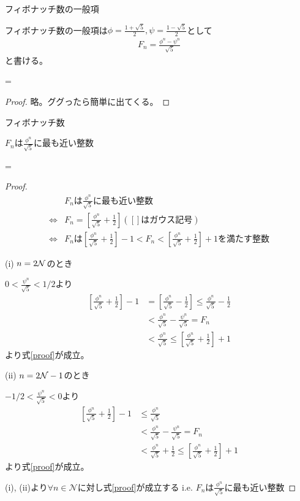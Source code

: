 \documentclass[a4paper,11pt]{jsarticle}
\newcommand{\EndIt}{}
\newenvironment{barred}[2][]{%
  \renewcommand{\EndIt}{\end{#2}}%
  \begin{#2}#1\noindent\newline
  \begin{lrbox}{\probbox}%
  \addtolength{\linewidth}{-12pt}%
  \begin{minipage}[t]{\linewidth}%
  \nointerlineskip
}{%
  \par
  \xdef\ResetDepth{\prevdepth=\the\prevdepth\relax}%
  \unskip\unskip\unpenalty
  \end{minipage}%
  \end{lrbox}%
  \noindent
  \makebox[\columnwidth]{%
    \hfill\vrule\hspace{2pt}\vrule\hfill
    \usebox{\probbox}}%
  \EndIt
  \ResetDepth
}
\begin{document}
\begin{barred}[フィボナッチ数の一般項]{Prop}
フィボナッチ数の一般項は$\phi = \frac{1 + \sqrt{5}}{2}, \psi = \frac{1 - \sqrt{5}}{2}$として
\begin{align}
F_n = \frac{\phi^n - \psi^n}{\sqrt{5}}
\end{align}
と書ける。
\end{barred}
\begin{proof}
略。ググったら簡単に出てくる。
\end{proof}

\begin{barred}[フィボナッチ数]{Prop}
$F_n$は$\frac{\phi^n}{\sqrt{5}}$に最も近い整数
\end{barred}

\begin{proof}
\begin{align}
&F_nは\frac{\phi^n}{\sqrt{5}}に最も近い整数\\
\Leftrightarrow& F_n = \left[ \frac{\phi^n}{\sqrt{5}} + \frac{1}{2} \right] ( [] はガウス記号 ) \\
\Leftrightarrow& F_n は \left[ \frac{\phi^n}{\sqrt{5}} + \frac{1}{2} \right] -1 < F_n < \left[ \frac{\phi^n}{\sqrt{5}} + \frac{1}{2} \right] + 1 を満たす整数
\label{proof}
\end{align}

(i) $n = 2\bold{\mathcal{N}}$のとき

$0<\frac{\psi^n}{\sqrt{5}}<1/2$より
\begin{align}
\left[ \frac{\phi^n}{\sqrt{5}} + \frac{1}{2} \right] -1
 &= \left[ \frac{\phi^n}{\sqrt{5}} - \frac{1}{2} \right]
 \le \frac{\phi^n}{\sqrt{5}} - \frac{1}{2} \\
 &< \frac{\phi^n}{\sqrt{5}} - \frac{\psi^n}{\sqrt{5}} = F_n\\
 &< \frac{\phi^n}{\sqrt{5}}
 \le \left[ \frac{\phi^n}{\sqrt{5}} + \frac{1}{2} \right] + 1
\end{align}
より式\eqref{proof}が成立。

(ii) $n = 2\bold{\mathcal{N}} - 1$のとき

$-1/2<\frac{\psi^n}{\sqrt{5}}<0$より
\begin{align}
\left[ \frac{\phi^n}{\sqrt{5}} + \frac{1}{2} \right] -1
 &\le \frac{\phi^n}{\sqrt{5}} \\
 &< \frac{\phi^n}{\sqrt{5}} - \frac{\psi^n}{\sqrt{5}} = F_n\\
 &< \frac{\phi^n}{\sqrt{5}} + \frac{1}{2}
 \le \left[ \frac{\phi^n}{\sqrt{5}} + \frac{1}{2} \right] + 1
\end{align}
より式\eqref{proof}が成立。

(i), (ii)より$\forall n \in \mathcal{N}$に対し式\eqref{proof}が成立する i.e. $F_n$は$\frac{\phi^n}{\sqrt{5}}$に最も近い整数
\end{proof}
\end{document}
